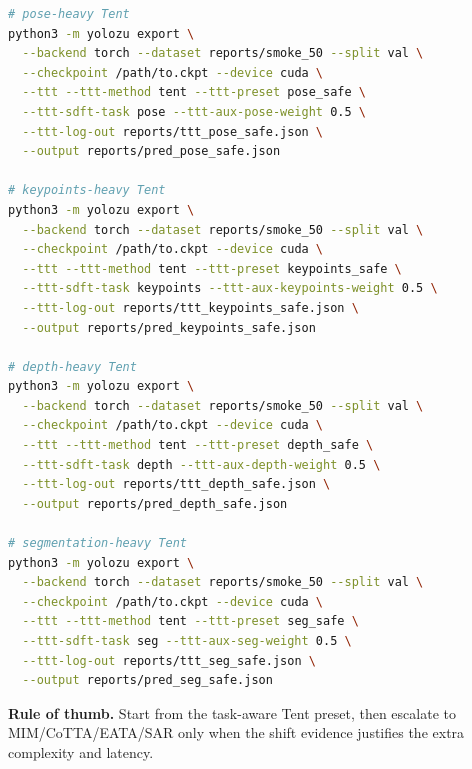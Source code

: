 \begin{lstlisting}[language=bash,caption={Task-aware TTT examples using the same export surface.}]
# pose-heavy Tent
python3 -m yolozu export \
  --backend torch --dataset reports/smoke_50 --split val \
  --checkpoint /path/to.ckpt --device cuda \
  --ttt --ttt-method tent --ttt-preset pose_safe \
  --ttt-sdft-task pose --ttt-aux-pose-weight 0.5 \
  --ttt-log-out reports/ttt_pose_safe.json \
  --output reports/pred_pose_safe.json

# keypoints-heavy Tent
python3 -m yolozu export \
  --backend torch --dataset reports/smoke_50 --split val \
  --checkpoint /path/to.ckpt --device cuda \
  --ttt --ttt-method tent --ttt-preset keypoints_safe \
  --ttt-sdft-task keypoints --ttt-aux-keypoints-weight 0.5 \
  --ttt-log-out reports/ttt_keypoints_safe.json \
  --output reports/pred_keypoints_safe.json

# depth-heavy Tent
python3 -m yolozu export \
  --backend torch --dataset reports/smoke_50 --split val \
  --checkpoint /path/to.ckpt --device cuda \
  --ttt --ttt-method tent --ttt-preset depth_safe \
  --ttt-sdft-task depth --ttt-aux-depth-weight 0.5 \
  --ttt-log-out reports/ttt_depth_safe.json \
  --output reports/pred_depth_safe.json

# segmentation-heavy Tent
python3 -m yolozu export \
  --backend torch --dataset reports/smoke_50 --split val \
  --checkpoint /path/to.ckpt --device cuda \
  --ttt --ttt-method tent --ttt-preset seg_safe \
  --ttt-sdft-task seg --ttt-aux-seg-weight 0.5 \
  --ttt-log-out reports/ttt_seg_safe.json \
  --output reports/pred_seg_safe.json
\end{lstlisting}

\textbf{Rule of thumb.}
Start from the task-aware Tent preset, then escalate to MIM/\allowbreak CoTTA/\allowbreak EATA/\allowbreak SAR only when the shift evidence justifies the extra complexity and latency.

